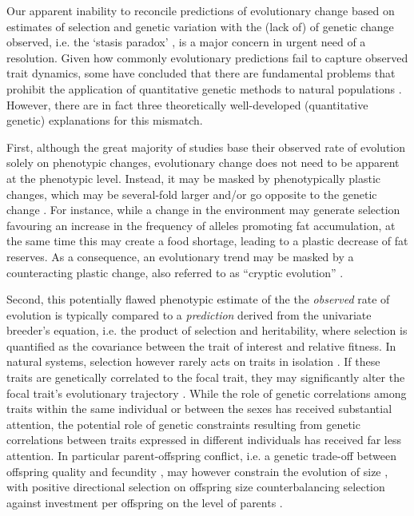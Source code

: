 Our apparent inability to reconcile predictions of evolutionary change based on estimates of selection and genetic variation with the (lack of) of genetic change observed, i.e. the `stasis paradox' \parencite{Merila2001}, is a major concern in urgent need of a resolution. Given how commonly evolutionary predictions fail to capture observed trait dynamics, some have concluded that there are fundamental problems that prohibit the application of quantitative genetic methods to natural populations \parencite{Steiner2012,Coulson2015}. However, there are in fact three theoretically well-developed (quantitative genetic) explanations for this mismatch. 

First, although the great majority of studies base their observed rate of evolution solely on phenotypic changes, evolutionary change does not need to be apparent at the phenotypic level. Instead, it may be masked by phenotypically plastic changes, which may be several-fold larger and/or go opposite to the genetic change \parencite{Postma2007a}. For instance, while a change in the environment may generate selection favouring an increase in the frequency of alleles promoting fat accumulation, at the same time this may create a food shortage, leading to a plastic decrease of fat reserves. As a consequence, an evolutionary trend may be masked by a counteracting plastic change, also referred to as ``cryptic evolution'' \parencite{Merila2001a,Hadfield2011}. 

Second, this potentially flawed phenotypic estimate of the the \emph{observed} rate of evolution is typically compared to a \emph{prediction} derived from the univariate breeder's equation, i.e. the product of selection and heritability, where selection is quantified as the covariance between the trait of interest and relative fitness. In natural systems, selection however rarely acts on traits in isolation \parencite{Lande1983}. If these traits are genetically correlated to the focal trait, they may significantly alter the focal trait's evolutionary trajectory \parencite{Schluter1991, Morrissey2012constraints}. While the role of genetic correlations among traits within the same individual \parencite{Teplitsky2014} or between the sexes \parencite{Poissant2010} has received substantial attention, the potential role of genetic constraints resulting from genetic correlations between traits expressed in different individuals has received far less attention. In particular parent-offspring conflict, i.e. a genetic trade-off between offspring quality and fecundity \parencite{Trivers1974}, may however constrain the evolution of size \parencite{Kolliker2015}, with positive directional selection on offspring size counterbalancing selection against investment per offspring on the level of parents \parencite{Rollinson2015b}. 

